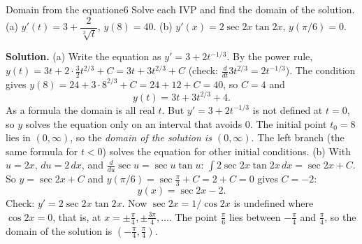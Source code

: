 \documentclass[11pt]{article}
\begin{document}
\begin{exmp}{Domain from the equation}{e6}
Solve each IVP and find the domain of the solution.
(a) $y'(t)=3+\dfrac2{\sqrt[3]t}$, $y(8)=40$. \quad (b) $y'(x)=2\sec2x\tan2x$, $y(\pi/6)=0$.

\textbf{Solution.} (a) Write the equation as $y'=3+2t^{-1/3}$. By the power rule, $y(t)=3t+2\cdot\frac32t^{2/3}+C=3t+3t^{2/3}+C$ (check: $\frac{d}{dt}3t^{2/3}=2t^{-1/3}$). The condition gives $y(8)=24+3\cdot8^{2/3}+C=24+12+C=40$, so $C=4$ and
\[
y(t)=3t+3t^{2/3}+4 .
\]
As a formula the domain is all real $t$. But $y'=3+2t^{-1/3}$ is not defined at $t=0$, so $y$ solves the equation only on an interval that avoids $0$. The initial point $t_0=8$ lies in $(0,\infty)$, so the \emph{domain of the solution is $(0,\infty)$}. The left branch (the same formula for $t<0$) solves the equation for other initial conditions.
(b) With $u=2x$, $du=2\,dx$, and $\frac d{du}\sec u=\sec u\tan u$: $\int2\sec2x\tan2x\,dx=\sec2x+C$. So $y=\sec2x+C$ and $y(\pi/6)=\sec\frac\pi3+C=2+C=0$ gives $C=-2$:
\[
y(x)=\sec2x-2 .
\]
Check: $y'=2\sec2x\tan2x$. Now $\sec2x=1/\cos2x$ is undefined where $\cos2x=0$, that is, at $x=\pm\frac\pi4,\pm\frac{3\pi}4,\dots$. The point $\frac\pi6$ lies between $-\frac\pi4$ and $\frac\pi4$, so the domain of the solution is $\left(-\frac\pi4,\frac\pi4\right)$.


\end{exmp}
\end{document}
